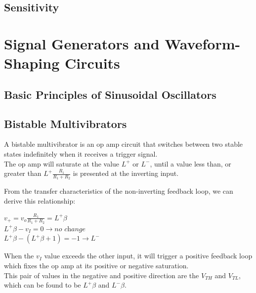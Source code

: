 \documentclass[11pt]{article}
\begin{document}
    \subsection{Sensitivity}


    \section{Signal Generators and Waveform-Shaping Circuits}



    \subsection{Basic Principles of Sinusoidal Oscillators}
    
    \subsection{Bistable Multivibrators}
    A bistable multivibrator is an op amp circuit that switches between two stable states indefinitely when it receives a trigger signal. \\
    
    The op amp will saturate at the value $L^+$ or $L^-$, until a value less than, or greater than $L^+\frac{R_1}{R_1+R_2}$ is presented at the inverting input.

    From the transfer characteristics of the non-inverting feedback loop, we can derive this relationship:

    \begin{center}
        $v_+ = v_o \frac{R_1}{R_1+R_2} = L^+\beta$ \\
        
        $L^+\beta - v_I = 0 \rightarrow \textit{no change}$     \\
        
        $L^+\beta - (L^+\beta + 1) = -1 \rightarrow L^-$ \\
        
    \end{center}

    When the $v_I$ value exceeds the other input, it will trigger a positive feedback loop which fixes the op amp at its positive or negative saturation. \\
    
    This pair of values in the negative and positive direction are the $V_{TH}$ and $V_{TL}$, which can be found to be $L^+\beta$ and $L^-\beta$.
    
\end{document}
